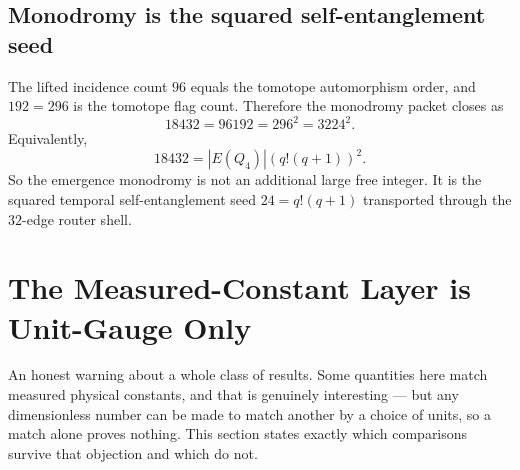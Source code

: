 \documentclass[12pt,a4paper]{article}
\def\cdot{ }%
\theoremstyle{definition}
\begin{document}
\subsection*{Monodromy is the squared self-entanglement seed}

The lifted incidence count $96$ equals the tomotope automorphism order, and
$192=2\cdot96$ is the tomotope flag count.  Therefore the monodromy packet
closes as
\[
  18432=96\cdot192=2\cdot96^2=32\cdot24^2.
\]
Equivalently,
\[
  18432 = |E(Q_4)|\cdot(q!(q+1))^2.
\]
So the emergence monodromy is not an additional large free integer.  It is the
squared temporal self-entanglement seed $24=q!(q+1)$ transported through the
$32$-edge router shell.

\section*{The Measured-Constant Layer is Unit-Gauge Only}

\begin{plainbox}
An honest warning about a whole class of results. Some quantities here match measured
physical constants, and that is genuinely interesting --- but any dimensionless number can
be made to match another by a choice of units, so a match alone proves nothing. This section
states exactly which comparisons survive that objection and which do not.
\end{plainbox}
\end{document}
